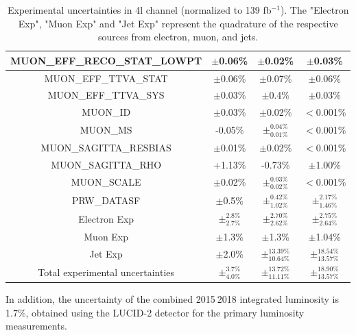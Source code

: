 \begin{table}[H]
\begin{center}
\begin{tabular}{|c|c|c|c|}
\hline
MUON\_EFF\_RECO\_STAT\_LOWPT&$\pm$0.06\%&$\pm$0.02\%&$\pm$0.03\%\\
\hline
MUON\_EFF\_TTVA\_STAT&$\pm$0.06\%&$\pm$0.07\%&$\pm$0.06\%\\
\hline
MUON\_EFF\_TTVA\_SYS&$\pm$0.03\%&$\pm$0.4\%&$\pm$0.03\%\\
\hline
MUON\_ID&$\pm$0.03\%&$\pm$0.02\%&$<$0.001\%\\
\hline
MUON\_MS&-0.05\%&$\pm^{0.04\%}_{0.01\%}$&$<$0.001\%\\
\hline
MUON\_SAGITTA\_RESBIAS&$\pm$0.01\%&$\pm$0.02\%&$<$0.001\%\\
\hline
MUON\_SAGITTA\_RHO&+1.13\%&-0.73\%&$\pm$1.00\%\\
\hline
MUON\_SCALE&$\pm$0.02\%&$\pm^{0.03\%}_{0.02\%}$&$<$0.001\%\\
\hline
PRW\_DATASF&$\pm$0.5\%&$\pm^{0.42\%}_{1.02\%}$&$\pm^{2.17\%}_{1.46\%}$\\
\hline
\hline
Electron Exp&$\pm^{2.8\%}_{2.7\%}$&$\pm^{2.70\%}_{2.62\%}$&$\pm^{2.75\%}_{2.64\%}$\\
\hline
Muon Exp&$\pm$1.3\%&$\pm$1.3\%&$\pm$1.04\%\\
\hline
Jet Exp&$\pm$2.0\%&$\pm^{13.39\%}_{10.64\%}$&$\pm^{18.54\%}_{13.57\%}$\\
\hline
\hline
Total experimental uncertainties &$\pm^{3.7\%}_{4.0\%}$&$\pm^{13.72\%}_{11.11\%}$&$\pm^{18.90\%}_{13.57\%}$\\
\hline
\end{tabular}
\caption{
Experimental uncertainties in 4l channel (normalized to 139 fb$^{-1}$).
The "Electron Exp", "Muon Exp" and "Jet Exp" represent the quadrature of the respective sources from electron, muon, and jets.
}
\label{tab:syst_exp_num}
\end{center}
\end{table}

In addition, the uncertainty of the combined 2015$~$2018 integrated luminosity is 1.7\%\cite{ATLAS-CONF-2019-021},
obtained using the LUCID-2 detector\cite{Avoni_2018} for the primary luminosity measurements.

